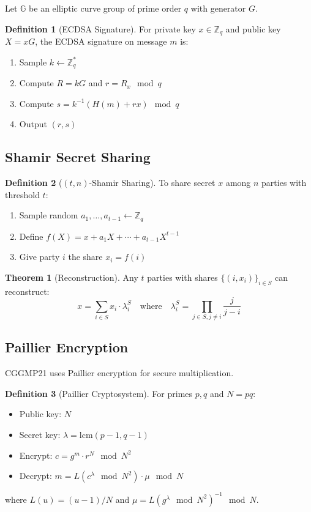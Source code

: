 \documentclass[11pt,a4paper]{article}
\theoremstyle{definition}
\newtheorem{definition}{Definition}
\newtheorem{theorem}{Theorem}
\begin{document}
Let $\mathbb{G}$ be an elliptic curve group of prime order $q$ with generator $G$.

\begin{definition}[ECDSA Signature]
For private key $x \in \mathbb{Z}_q$ and public key $X = xG$, the ECDSA signature on message $m$ is:
\begin{enumerate}
\item Sample $k \leftarrow \mathbb{Z}_q^*$
\item Compute $R = kG$ and $r = R_x \mod q$
\item Compute $s = k^{-1}(H(m) + rx) \mod q$
\item Output $(r, s)$
\end{enumerate}
\end{definition}

\subsection{Shamir Secret Sharing}

\begin{definition}[$(t,n)$-Shamir Sharing]
To share secret $x$ among $n$ parties with threshold $t$:
\begin{enumerate}
\item Sample random $a_1, \ldots, a_{t-1} \leftarrow \mathbb{Z}_q$
\item Define $f(X) = x + a_1 X + \cdots + a_{t-1} X^{t-1}$
\item Give party $i$ the share $x_i = f(i)$
\end{enumerate}
\end{definition}

\begin{theorem}[Reconstruction]
Any $t$ parties with shares $\{(i, x_i)\}_{i \in S}$ can reconstruct:
\[
x = \sum_{i \in S} x_i \cdot \lambda_i^S \quad \text{where} \quad \lambda_i^S = \prod_{j \in S, j \neq i} \frac{j}{j - i}
\]
\end{theorem}

\subsection{Paillier Encryption}

CGGMP21 uses Paillier encryption for secure multiplication.

\begin{definition}[Paillier Cryptosystem]
For primes $p, q$ and $N = pq$:
\begin{itemize}
\item Public key: $N$
\item Secret key: $\lambda = \text{lcm}(p-1, q-1)$
\item Encrypt: $c = g^m \cdot r^N \mod N^2$
\item Decrypt: $m = L(c^\lambda \mod N^2) \cdot \mu \mod N$
\end{itemize}
where $L(u) = (u-1)/N$ and $\mu = L(g^\lambda \mod N^2)^{-1} \mod N$.
\end{definition}
\end{document}
